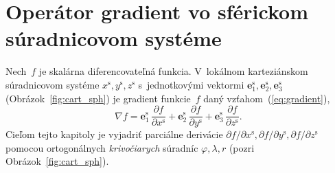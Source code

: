 \documentclass[a4paper, 12pt]{book}
\let\vec\mathbf
\begin{document}
\section{Operátor gradient vo sférickom súradnicovom systéme}
\label{app:gradient_in_spherical_coordinates}

Nech~$f$ je skalárna diferencovateľná funkcia.  V~lokálnom karteziánskom 
súradnicovom systéme $x^{\mathrm{s}}, y^{\mathrm{s}}, z^{\mathrm{s}}$ 
s~jednotkovými vektormi $\vec e^\mathrm{s}_1, \vec e^\mathrm{s}_2, \vec 
e^\mathrm{s}_3$ (Obrázok~\ref{fig:cart_sph}) je gradient funkcie~$f$ daný 
vzťahom~(\ref{eq:gradient}),
%
\begin{equation}
\nabla f = \vec e^\mathrm{s}_1 \, \frac{\partial f}{\partial x^{\mathrm{s}}} 
+ \vec e^\mathrm{s}_2 \, \frac{\partial f}{\partial y^{\mathrm{s}}} + \vec 
e^\mathrm{s}_3 \, \frac{\partial f}{\partial z^{\mathrm{s}}}{.}
\end{equation}
%
Cieľom tejto kapitoly je vyjadriť parciálne derivácie $\partial f \slash 
\partial x^{\mathrm{s}}, \partial f \slash \partial y^{\mathrm{s}}, \partial 
f \slash \partial z^{\mathrm{s}}$ pomocou ortogonálnych \emph{krivočiarych} 
súradníc $\varphi, \lambda, r$ (pozri Obrázok~\ref{fig:cart_sph}).
\end{document}

